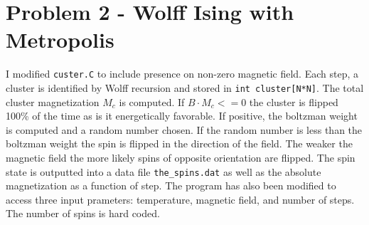 \documentclass[singlepage,notitlepage,nofootinbib,11pt]{revtex4-1}
\begin{document}
\section{Problem 2 - Wolff Ising with Metropolis}
I modified \verb|custer.C| to include presence on non-zero magnetic field. Each step, a cluster is identified by Wolff recursion and stored in \verb|int cluster[N*N]|. The total cluster magnetization $M_c$ is computed. If $B\cdot M_c <= 0$ the cluster is flipped 100\% of the time as is it energetically favorable. If positive, the boltzman weight is computed and a random number chosen. If the random number is less than the boltzman weight the spin is flipped in the direction of the field. The weaker the magnetic field the more likely spins of opposite orientation are flipped. The spin state is outputted into a data file \verb|the_spins.dat| as well as the absolute magnetization as a function of step. The program has also been modified to access three input prameters: temperature, magnetic field, and number of steps. The number of spins is hard coded. 
\end{document}
